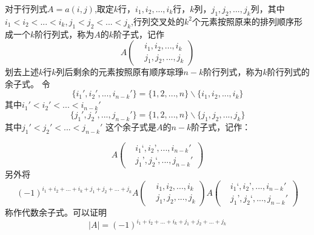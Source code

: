 \documentclass[blue,normal,cn]{elegantnote}
\begin{document}
\begin{theorem}
    对于行列式$A=a(i,j)$,取定$k$行，$i_1,i_2,...,i_k$行，$k$列，$j_1,j_2,...,j_k$列，其中$i_1<i_2<...<i_k,j_1<j_2<...<j_k$,行列交叉处的$k^2$个元素按照原来的排列顺序形成一个$k$阶行列式，称为$A$的$k$阶子式，记作
    \begin{equation*}
        A\left(
            \begin{aligned}
                &i_1,i_2,...,i_k\\
                &j_1,j_2,...,j_k
            \end{aligned}
        \right)
    \end{equation*}
    划去上述$k$行$k$列后剩余的元素按照原有顺序琮琤$n-k$阶行列式，称为$k$阶行列式的余子式。
    令
    $$\{i_1',i_2',...,i_{n-k}'\}=\{1,2,...,n\}\backslash \{i_1,i_2,...,i_k\}$$
    其中$i_1'<i_2'<...<i_{n-k}'$
    $$\{j_1',j_2',...,j_{n-k}'\}=\{1,2,...,n\}\backslash \{j_1,j_2,...,j_k\}$$
    其中$j_1'<j_2'<...<j_{n-k}'$
    这个余子式是$A$的$n-k$阶子式，记作：
    
    \begin{equation*}
        A\left(
            \begin{aligned}
                &i_1‘,i_2’,...,i_{n-k}'\\
                &j_1’,j_2‘,...,j_{n-k}'
            \end{aligned}
        \right)
    \end{equation*}
    另外将
    \begin{equation*}
        (-1)^{i_1+i_2+...+i_k+j_1+j_2+...+j_k}
        A\left(
            \begin{aligned}
                &i_1,i_2,...,i_k\\
                &j_1,j_2,...,j_k
            \end{aligned}
        \right)
        A\left(
            \begin{aligned}
                &i_1‘,i_2’,...,i_{n-k}'\\
                &j_1’,j_2‘,...,j_{n-k}'
            \end{aligned}
        \right)
    \end{equation*}
    称作代数余子式。可以证明
    \begin{equation*}
        |A|=(-1)^{i_1+i_2+...+i_k+j_1+j_2+...+j_k}


\end{equation*}
\end{theorem}
\end{document}

